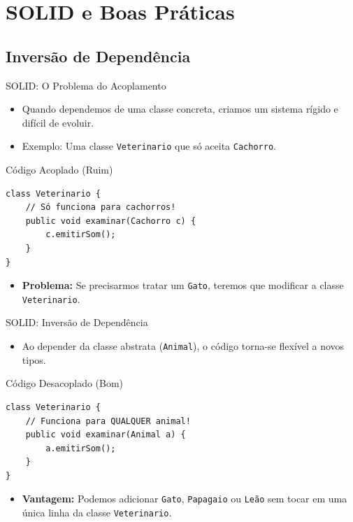 \documentclass[9pt]{beamer}
\begin{document}
\section{SOLID e Boas Práticas}
\subsection{Inversão de Dependência}
\begin{frame}[fragile]{SOLID: O Problema do Acoplamento}
\begin{itemize}
    \item Quando dependemos de uma classe concreta, criamos um sistema rígido e difícil de evoluir.
    \item Exemplo: Uma classe \texttt{Veterinario} que só aceita \texttt{Cachorro}.
\end{itemize}

\begin{block}{Código Acoplado (Ruim)}
\begin{verbatim}
class Veterinario {
    // Só funciona para cachorros!
    public void examinar(Cachorro c) { 
        c.emitirSom();
    }
}
\end{verbatim}
\end{block}
\begin{itemize}
    \item \textbf{Problema:} Se precisarmos tratar um \texttt{Gato}, teremos que modificar a classe \texttt{Veterinario}.
\end{itemize}
\end{frame}

\begin{frame}[fragile]{SOLID: Inversão de Dependência}
\begin{itemize}
    \item Ao depender da classe abstrata (\texttt{Animal}), o código torna-se flexível a novos tipos.
\end{itemize}

\begin{block}{Código Desacoplado (Bom)}
\begin{verbatim}
class Veterinario {
    // Funciona para QUALQUER animal!
    public void examinar(Animal a) { 
        a.emitirSom();
    }
}
\end{verbatim}
\end{block}
\begin{itemize}
    \item \textbf{Vantagem:} Podemos adicionar \texttt{Gato}, \texttt{Papagaio} ou \texttt{Leão} sem tocar em uma única linha da classe \texttt{Veterinario}.
\end{itemize}
\end{frame}
\end{document}
